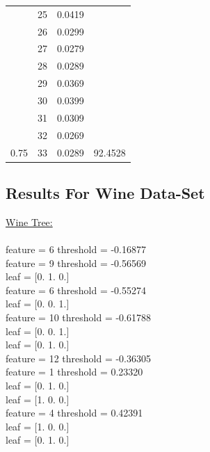\documentclass{article}
\begin{document}
\begin{multicols}{2}
\begin{table}[H]
\begin{tabular}{|c|c|c|c|}
 & 25 & 0.0419 &  \\ \cline{2-3}
 & 26 & 0.0299 &  \\ \cline{2-3}
 & 27 & 0.0279 &  \\ \cline{2-3}
 & 28 & 0.0289 &  \\ \cline{2-3}
 & 29 & 0.0369 &  \\ \cline{2-3}
 & 30 & 0.0399 &  \\ \cline{2-3}
 & 31 & 0.0309 &  \\ \cline{2-3}
 & 32 & 0.0269 &  \\ \cline{2-3}
\multirow{-34}{*}{0.75} & 33 & 0.0289 & \multirow{-21}{*}{92.4528} \\ \hline
\end{tabular}
\end{table}
\end{multicols}
\newpage
\subsection{Results For Wine Data-Set}

\underline{\large{Wine Tree:}}\\ \\
\hspace*{0pt}feature =  6 threshold =  -0.16877\\
\hspace*{15pt}feature =  9 threshold =  -0.56569\\
\hspace*{25pt}leaf =  [0. 1. 0.] \\
\hspace*{25pt}feature =  6 threshold =  -0.55274\\
\hspace*{40pt}leaf =  [0. 0. 1.] \\
\hspace*{40pt}feature =  10 threshold =  -0.61788\\
\hspace*{55pt}leaf =  [0. 0. 1.] \\
\hspace*{55pt}leaf =  [0. 1. 0.] \\
\hspace*{15pt}feature =  12 threshold =  -0.36305\\
\hspace*{25pt}feature =  1 threshold =  0.23320\\
\hspace*{40pt}leaf =  [0. 1. 0.] \\
\hspace*{40pt}leaf =  [1. 0. 0.] \\
\hspace*{25pt}feature =  4 threshold =  0.42391\\
\hspace*{40pt}leaf =  [1. 0. 0.] \\
\hspace*{40pt}leaf =  [0. 1. 0.] \\
\end{document}
